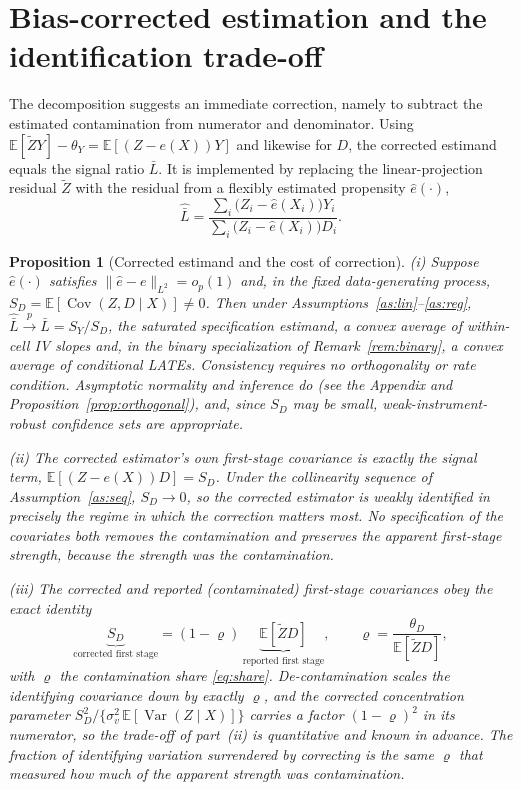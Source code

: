 \documentclass[preprint,11pt,authoryear]{elsarticle}
\newtheorem{proposition}{Proposition}
\theoremstyle{definition}
\newcommand{\E}{\mathbb{E}}
\newcommand{\Cov}{\operatorname{Cov}}
\newcommand{\Var}{\operatorname{Var}}
\newcommand{\Ztil}{\tilde{Z}}
\newcommand{\convp}{\overset{p}{\longrightarrow}}
\begin{document}
\section{Bias-corrected estimation and the identification trade-off}\label{sec:correction}

The decomposition suggests an immediate correction, namely to subtract the
estimated contamination from numerator and denominator. Using
$\E[\Ztil Y]-\theta_Y=\E[(Z-e(X))Y]$ and likewise for $D$, the corrected estimand
equals the signal ratio $\bar L$. It is implemented by replacing the
linear-projection residual $\Ztil$ with the residual from a flexibly
estimated propensity $\hat e(\cdot)$,
\begin{equation}\label{eq:correction}
\hat{\bar L}=\frac{\sum_{i}\big(Z_i-\hat e(X_i)\big)Y_i}
                  {\sum_{i}\big(Z_i-\hat e(X_i)\big)D_i}.
\end{equation}

\begin{proposition}[Corrected estimand and the cost of correction]\label{prop:correction}
(i) Suppose $\hat e(\cdot)$ satisfies $\|\hat e-e\|_{L^2}=o_p(1)$ and, in the fixed
data-generating process, $S_D=\E[\Cov(Z,D\mid X)]\neq0$. Then under
Assumptions~\ref{as:lin}--\ref{as:reg}, $\hat{\bar L}\convp \bar L=S_Y/S_D$, the
saturated specification estimand, a convex average of within-cell IV slopes and, in the
binary specialization of Remark~\ref{rem:binary}, a convex average of conditional LATEs.
Consistency requires no orthogonality or rate condition. Asymptotic normality and
inference do (see the Appendix and Proposition~\ref{prop:orthogonal}), and, since $S_D$
may be small, weak-instrument-robust confidence sets are appropriate.

(ii) The corrected estimator's own first-stage covariance is exactly the signal term,
$\E[(Z-e(X))D]=S_D$. Under the collinearity sequence of Assumption~\ref{as:seq},
$S_D\to0$, so the corrected estimator is weakly identified in precisely the regime in
which the correction matters most. No specification of the covariates both removes the
contamination and preserves the apparent first-stage strength, because the strength was
the contamination.\label{prop:tradeoff}

(iii) The corrected and reported (contaminated) first-stage covariances obey the exact
identity
\[
\underbrace{S_D}_{\text{corrected first stage}}
=(1-\varrho)\,\underbrace{\E[\Ztil D]}_{\text{reported first stage}},
\qquad \varrho=\frac{\theta_D}{\E[\Ztil D]},
\]
with $\varrho$ the contamination share \eqref{eq:share}. De-contamination scales the
identifying covariance down by exactly $\varrho$, and the corrected concentration
parameter $S_D^2/\{\sigma_v^2\,\E[\Var(Z\mid X)]\}$ carries a factor $(1-\varrho)^2$ in
its numerator, so the trade-off of part~(ii) is quantitative and known in advance. The
fraction of identifying variation surrendered by correcting is the same $\varrho$ that
measured how much of the apparent strength was contamination.\label{cor:frontier}
\end{proposition}
\end{document}
